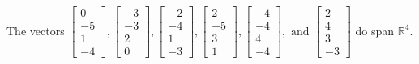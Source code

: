 \begin{exercise}
\begin{exerciseStatement}
  \end{exerciseStatement}
  \begin{exerciseAnswer}
   The vectors \(\left[\begin{array}{r}
0 \\
-5 \\
1 \\
-4
\end{array}\right] , \left[\begin{array}{r}
-3 \\
-3 \\
2 \\
0
\end{array}\right] , \left[\begin{array}{r}
-2 \\
-4 \\
1 \\
-3
\end{array}\right] , \left[\begin{array}{r}
2 \\
-5 \\
3 \\
1
\end{array}\right] , \left[\begin{array}{r}
-4 \\
-4 \\
4 \\
-4
\end{array}\right] , \text{ and } \left[\begin{array}{r}
2 \\
4 \\
3 \\
-3
\end{array}\right]\) 
  	 do  
	span \(\mathbb{R}^4\).
  


  \end{exerciseAnswer}
\end{exercise}